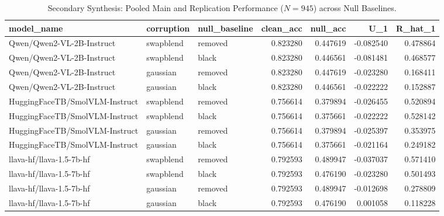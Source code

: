 \begin{table}[t]
\centering
\caption{Secondary Synthesis: Pooled Main and Replication Performance ($N=945$) across Null Baselines.}
\label{tab:vlm_pooled_summary}
\small
\begin{tabular}{lllrrrr}
\toprule
model_name & corruption & null_baseline & clean_acc & null_acc & U_1 & R_hat_1 \\
\midrule
Qwen/Qwen2-VL-2B-Instruct & swapblend & removed & 0.823280 & 0.447619 & -0.082540 & 0.478864 \\
Qwen/Qwen2-VL-2B-Instruct & swapblend & black & 0.823280 & 0.446561 & -0.081481 & 0.468577 \\
Qwen/Qwen2-VL-2B-Instruct & gaussian & removed & 0.823280 & 0.447619 & -0.023280 & 0.168411 \\
Qwen/Qwen2-VL-2B-Instruct & gaussian & black & 0.823280 & 0.446561 & -0.022222 & 0.152887 \\
HuggingFaceTB/SmolVLM-Instruct & swapblend & removed & 0.756614 & 0.379894 & -0.026455 & 0.520894 \\
HuggingFaceTB/SmolVLM-Instruct & swapblend & black & 0.756614 & 0.375661 & -0.022222 & 0.528142 \\
HuggingFaceTB/SmolVLM-Instruct & gaussian & removed & 0.756614 & 0.379894 & -0.025397 & 0.353975 \\
HuggingFaceTB/SmolVLM-Instruct & gaussian & black & 0.756614 & 0.375661 & -0.021164 & 0.249182 \\
llava-hf/llava-1.5-7b-hf & swapblend & removed & 0.792593 & 0.489947 & -0.037037 & 0.571410 \\
llava-hf/llava-1.5-7b-hf & swapblend & black & 0.792593 & 0.476190 & -0.023280 & 0.501493 \\
llava-hf/llava-1.5-7b-hf & gaussian & removed & 0.792593 & 0.489947 & -0.012698 & 0.278809 \\
llava-hf/llava-1.5-7b-hf & gaussian & black & 0.792593 & 0.476190 & 0.001058 & 0.118228 \\
\bottomrule
\end{tabular}

\end{table}